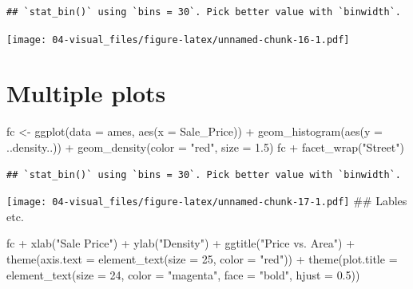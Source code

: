 \documentclass[
]{book}
\newenvironment{Shaded}{\begin{snugshade}}{\end{snugshade}}
\newcommand{\AttributeTok}[1]{\textcolor[rgb]{0.77,0.63,0.00}{#1}}
\newcommand{\DecValTok}[1]{\textcolor[rgb]{0.00,0.00,0.81}{#1}}
\newcommand{\FloatTok}[1]{\textcolor[rgb]{0.00,0.00,0.81}{#1}}
\newcommand{\FunctionTok}[1]{\textcolor[rgb]{0.00,0.00,0.00}{#1}}
\newcommand{\NormalTok}[1]{#1}
\newcommand{\OtherTok}[1]{\textcolor[rgb]{0.56,0.35,0.01}{#1}}
\newcommand{\SpecialCharTok}[1]{\textcolor[rgb]{0.00,0.00,0.00}{#1}}
\newcommand{\StringTok}[1]{\textcolor[rgb]{0.31,0.60,0.02}{#1}}
\begin{document}
\begin{verbatim}
## `stat_bin()` using `bins = 30`. Pick better value with `binwidth`.
\end{verbatim}

\texttt{[image: 04-visual\_files/figure-latex/unnamed-chunk-16-1.pdf]}

\hypertarget{multiple-plots}{%
\section{Multiple plots}\label{multiple-plots}}

\begin{Shaded}
\begin{Highlighting}[]
\NormalTok{fc }\OtherTok{\textless{}{-}} \FunctionTok{ggplot}\NormalTok{(}\AttributeTok{data =}\NormalTok{ ames, }\FunctionTok{aes}\NormalTok{(}\AttributeTok{x =}\NormalTok{ Sale\_Price)) }\SpecialCharTok{+}
  \FunctionTok{geom\_histogram}\NormalTok{(}\FunctionTok{aes}\NormalTok{(}\AttributeTok{y =}\NormalTok{ ..density..)) }\SpecialCharTok{+}
  \FunctionTok{geom\_density}\NormalTok{(}\AttributeTok{color =} \StringTok{"red"}\NormalTok{,}
               \AttributeTok{size =} \FloatTok{1.5}\NormalTok{)}
\NormalTok{fc }\SpecialCharTok{+} \FunctionTok{facet\_wrap}\NormalTok{(}\StringTok{"Street"}\NormalTok{)}
\end{Highlighting}
\end{Shaded}

\begin{verbatim}
## `stat_bin()` using `bins = 30`. Pick better value with `binwidth`.
\end{verbatim}

\texttt{[image: 04-visual\_files/figure-latex/unnamed-chunk-17-1.pdf]}
\#\# Lables etc.

\begin{Shaded}
\begin{Highlighting}[]
\NormalTok{fc }\SpecialCharTok{+} 
  \FunctionTok{xlab}\NormalTok{(}\StringTok{"Sale Price"}\NormalTok{) }\SpecialCharTok{+} 
  \FunctionTok{ylab}\NormalTok{(}\StringTok{"Density"}\NormalTok{) }\SpecialCharTok{+} 
  \FunctionTok{ggtitle}\NormalTok{(}\StringTok{"Price vs. Area"}\NormalTok{) }\SpecialCharTok{+}
  \FunctionTok{theme}\NormalTok{(}\AttributeTok{axis.text =} \FunctionTok{element\_text}\NormalTok{(}\AttributeTok{size =} \DecValTok{25}\NormalTok{, }\AttributeTok{color =} \StringTok{"red"}\NormalTok{)) }\SpecialCharTok{+}
  \FunctionTok{theme}\NormalTok{(}\AttributeTok{plot.title =} \FunctionTok{element\_text}\NormalTok{(}\AttributeTok{size =} \DecValTok{24}\NormalTok{, }
                                     \AttributeTok{color =} \StringTok{"magenta"}\NormalTok{, }
                                     \AttributeTok{face =} \StringTok{"bold"}\NormalTok{,}
                                     \AttributeTok{hjust =} \FloatTok{0.5}\NormalTok{)) }
\end{Highlighting}
\end{Shaded}
\end{document}
